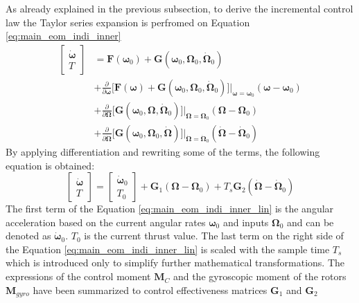 \documentclass[11pt, a4paper, twoside]{report}
\begin{document}
As already explained in the previous subsection, to derive the incremental control law the Taylor series expansion is perfromed on Equation \ref{eq:main_eom_indi_inner}
\begin{equation}
	\begin{split}
		\begin{bmatrix}
			\bm{\dot{\omega}}\\
			T
		\end{bmatrix} &= \bm{F}(\bm{\omega}_0) + \bm{G}(\bm{\omega}_0, \bm{\Omega}_0, \bm{\dot{\Omega}}_0) \\
		&+ \frac{\partial}{\partial \bm{\omega}} \big[\bm{F}(\bm{\omega}) + \bm{G}(\bm{\omega}_0, \bm{\Omega}_0, \bm{\dot{\Omega}}_0) \big] \bigg| _{\bm{\omega}=\bm{\omega}_0} (\bm{\omega}-\bm{\omega}_0) \\
		&+ \frac{\partial}{\partial \bm{\Omega}} \big[\bm{G}(\bm{\omega}_0, \bm{\Omega}, \bm{\dot{\Omega}}_0) \big] \bigg| _{\bm{\Omega}=\bm{\Omega}_0} (\bm{\Omega}-\bm{\Omega}_0) \\
		&+ \frac{\partial}{\partial \bm{\dot{\Omega}}} \big[\bm{G}(\bm{\omega}_0, \bm{\Omega}_0, \bm{\dot{\Omega}}) \big] \bigg| _{\bm{\dot{\Omega}}=\bm{\dot{\Omega}}_0} (\bm{\dot{\Omega}}-\bm{\dot{\Omega}}_0)
		\label{eq:main_eom_indi_inner_taylor}
	\end{split}
\end{equation}
By applying differentiation and rewriting some of the terms, the following equation is obtained:
\begin{equation}
	\begin{bmatrix}
		\bm{\dot{\omega}}\\
		T
	\end{bmatrix} = 
	\begin{bmatrix}
		\bm{\dot{\omega}}_0\\
		T_0
	\end{bmatrix} + \bm{G}_1(\bm{\Omega} - \bm{\Omega}_0) + T_s \bm{G}_2(\bm{\dot{\Omega}} - \bm{\dot{\Omega}}_0)
	\label{eq:main_eom_indi_inner_lin}
\end{equation}
The first term of the Equation \ref{eq:main_eom_indi_inner_lin} is the angular acceleration based on the current angular rates $\bm{\omega}_0$ and inputs $\bm{\Omega}_0$ and can be denoted as $\bm{\dot{\omega}}_0$. $T_0$ is the current thrust value. The last term on the right side of the Equation \ref{eq:main_eom_indi_inner_lin} is scaled with the sample time $T_s$ which is introduced only to simplify further mathematical transformations. The expressions of the control moment $\bm{M}_C$ and the gyroscopic moment of the rotors $\bm{M}_{gyro}$ have been summarized to control effectiveness matrices $\bm{G}_1$ and $\bm{G}_2$
\end{document}
